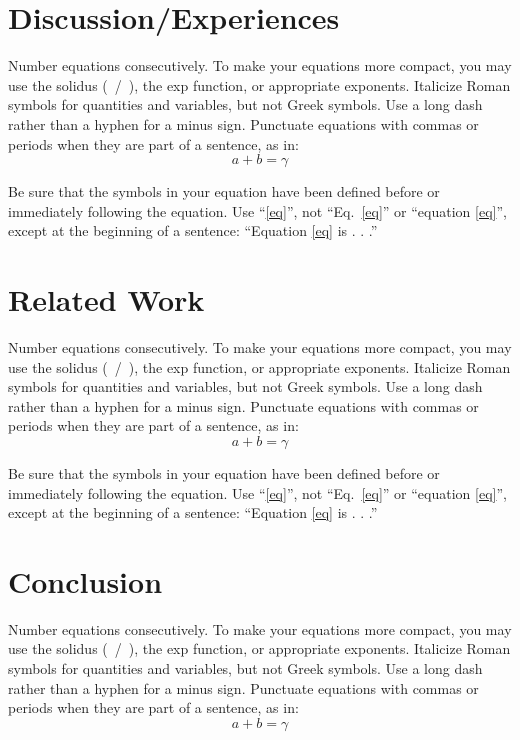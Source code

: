 \documentclass[conference]{IEEEtran}
\begin{document}
\section{Discussion/Experiences}
Number equations consecutively. To make your 
equations more compact, you may use the solidus (~/~), the exp function, or 
appropriate exponents. Italicize Roman symbols for quantities and variables, 
but not Greek symbols. Use a long dash rather than a hyphen for a minus 
sign. Punctuate equations with commas or periods when they are part of a 
sentence, as in:
\begin{equation}
a+b=\gamma\label{eq}
\end{equation}

Be sure that the 
symbols in your equation have been defined before or immediately following 
the equation. Use ``\eqref{eq}'', not ``Eq.~\eqref{eq}'' or ``equation \eqref{eq}'', except at 
the beginning of a sentence: ``Equation \eqref{eq} is . . .''


\section{Related Work}
Number equations consecutively. To make your 
equations more compact, you may use the solidus (~/~), the exp function, or 
appropriate exponents. Italicize Roman symbols for quantities and variables, 
but not Greek symbols. Use a long dash rather than a hyphen for a minus 
sign. Punctuate equations with commas or periods when they are part of a 
sentence, as in:
\begin{equation}
a+b=\gamma\label{eq}
\end{equation}

Be sure that the 
symbols in your equation have been defined before or immediately following 
the equation. Use ``\eqref{eq}'', not ``Eq.~\eqref{eq}'' or ``equation \eqref{eq}'', except at 
the beginning of a sentence: ``Equation \eqref{eq} is . . .''


\section{Conclusion}
Number equations consecutively. To make your 
equations more compact, you may use the solidus (~/~), the exp function, or 
appropriate exponents. Italicize Roman symbols for quantities and variables, 
but not Greek symbols. Use a long dash rather than a hyphen for a minus 
sign. Punctuate equations with commas or periods when they are part of a 
sentence, as in:
\begin{equation}
a+b=\gamma\label{eq}
\end{equation}
\end{document}
